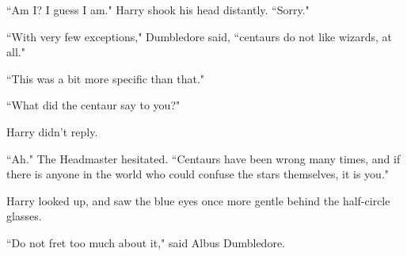 ``Am I? I guess I am." Harry shook his head distantly. ``Sorry."

``With very few exceptions," Dumbledore said, ``centaurs do not like wizards, at all."

``This was a bit more specific than that."

``What did the centaur say to you?"

Harry didn't reply.

``Ah." The Headmaster hesitated. ``Centaurs have been wrong many times, and if there is anyone in the world who could confuse the stars themselves, it is you."

Harry looked up, and saw the blue eyes once more gentle behind the half-circle glasses.

``Do not fret too much about it," said Albus Dumbledore.

